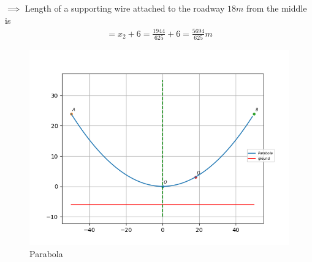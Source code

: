 \documentclass[journal,12pt,twocolumn]{IEEEtran}
\begin{document}
$\implies$ Length of a supporting wire attached to the roadway $18 m$ from the middle is 
\begin{align}
    = x_2 + 6 =  \frac{1944}{625} + 6 = \frac{5694}{625} m   
\end{align}

\begin{figure}[!htb]
    \centering
    \includegraphics[width=\columnwidth]{figs/parabola.png}
    \caption{Parabola}
    \label{fig:parabola}
\end{figure}
\end{document}
